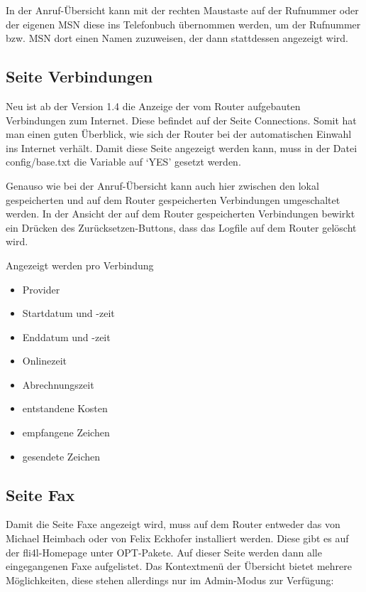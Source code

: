   In der Anruf-Übersicht kann mit der rechten Maustaste auf der
  Rufnummer oder der eigenen MSN diese ins Telefonbuch übernommen
  werden, um der Rufnummer bzw. MSN dort einen Namen zuzuweisen, der
  dann stattdessen angezeigt wird.


  \subsection{Seite Verbindungen}

  Neu ist ab der Version 1.4 die Anzeige der vom Router aufgebauten
  Verbindungen zum Internet. Diese befindet auf der Seite Connections.
  Somit hat man einen guten Überblick, wie sich der Router bei der
  automatischen Einwahl ins Internet verhält. Damit diese Seite
  angezeigt werden kann, muss in der Datei config/base.txt die
  Variable  auf `YES' gesetzt werden.

  Genauso wie bei der Anruf-Übersicht kann auch hier zwischen den
  lokal gespeicherten und auf dem Router gespeicherten Verbindungen
  umgeschaltet werden.  In der Ansicht der auf dem Router
  gespeicherten Verbindungen bewirkt ein Drücken des Zurücksetzen-Buttons,
  dass das Logfile auf dem Router gelöscht wird.

  Angezeigt werden pro Verbindung
  \begin{itemize}
  \item Provider
  \item Startdatum und -zeit
  \item Enddatum und -zeit
  \item Onlinezeit
  \item Abrechnungszeit
  \item entstandene Kosten
  \item empfangene Zeichen
  \item gesendete Zeichen
  \end{itemize}

  \subsection{Seite Fax}

  Damit die Seite Faxe angezeigt wird, muss auf dem Router entweder das
   von Michael Heimbach oder  von Felix Eckhofer
  installiert werden. Diese gibt es auf der fli4l-Homepage unter
  OPT-Pakete. Auf dieser Seite werden dann alle eingegangenen Faxe
  aufgelistet. Das Kontextmenü der Übersicht bietet mehrere Möglichkeiten,
  diese stehen allerdings nur im Admin-Modus zur Verfügung:

